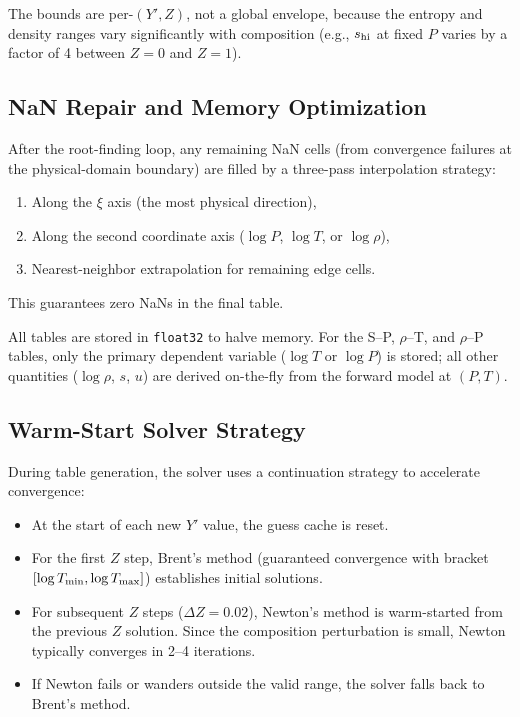 \documentclass[twocolumn]{aastex701}
\begin{document}
The bounds are per-$(Y', Z)$, not a global envelope, because the entropy and density ranges vary significantly with composition (e.g., $s_{\rm hi}$ at fixed $P$ varies by a factor of 4 between $Z=0$ and $Z=1$).

\subsection{NaN Repair and Memory Optimization}

After the root-finding loop, any remaining NaN cells (from convergence failures at the physical-domain boundary) are filled by a three-pass interpolation strategy:
\begin{enumerate}
    \item Along the $\xi$ axis (the most physical direction),
    \item Along the second coordinate axis ($\log P$, $\log T$, or $\log\rho$),
    \item Nearest-neighbor extrapolation for remaining edge cells.
\end{enumerate}
This guarantees zero NaNs in the final table.

All tables are stored in \texttt{float32} to halve memory.
For the S--P, $\rho$--T, and $\rho$--P tables, only the primary dependent variable ($\log T$ or $\log P$) is stored; all other quantities ($\log\rho$, $s$, $u$) are derived on-the-fly from the forward model at $(P, T)$.

\subsection{Warm-Start Solver Strategy}

During table generation, the solver uses a continuation strategy to accelerate convergence:
\begin{itemize}
    \item At the start of each new $Y'$ value, the guess cache is reset.
    \item For the first $Z$ step, Brent's method (guaranteed convergence with bracket $[\log T_{\rm min}, \log T_{\rm max}]$) establishes initial solutions.
    \item For subsequent $Z$ steps ($\Delta Z = 0.02$), Newton's method is warm-started from the previous $Z$ solution.  Since the composition perturbation is small, Newton typically converges in 2--4 iterations.
    \item If Newton fails or wanders outside the valid range, the solver falls back to Brent's method.
\end{itemize}
\end{document}
